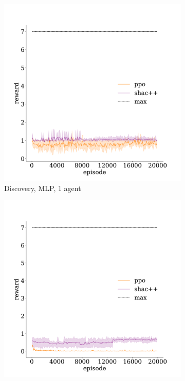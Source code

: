 \begin{figure}[t]
    \begin{subfigure}[b]{0.30\textwidth}
        \includegraphics[width=\textwidth]{figs/discovery-1-mlp.pdf}
        \caption{Discovery, MLP, 1 agent}
        \label{apx:fig:discovery-mlp-1}
    \end{subfigure}
    \begin{subfigure}[b]{0.30\textwidth}
        \includegraphics[width=\textwidth]{figs/discovery-3-mlp.pdf}

\end{subfigure}
\end{figure}
